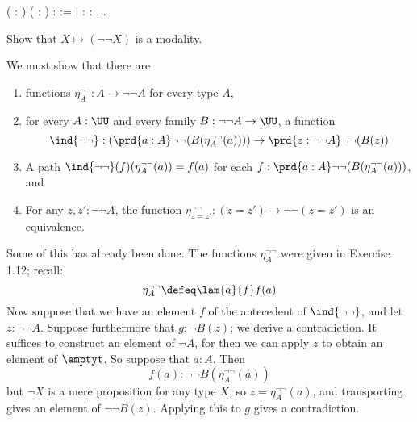   \begin{coqdoccode}
\coqdocemptyline
\coqdocnoindent
{}  ( : ) ( :   ) :  :=\coqdoceol
\coqdocindent{1.00em}
\ensuremath{|}  : \coqdockw{\ensuremath{\forall}}  : ,          .\coqdoceol
\coqdocemptyline
\end{coqdoccode}
               

Show that $X \mapsto (\lnot \lnot X)$ is a modality.


 \soln
We must show that there are
\begin{enumerate}
  \item functions $\eta^{\lnot \lnot}_{A} : A \to \lnot\lnot A$ for every type
  $A$,
  \item for every $A : \UU$ and every family $B : \lnot\lnot A \to \UU$, a
  function
  \[
    \ind{\lnot\lnot} : 
    \left(\prd{a : A}\lnot\lnot(B(\eta^{\lnot\lnot}_{A}(a)))\right)
    \to
    \prd{z : \lnot\lnot A}\lnot\lnot(B(z))
  \]
  \item A path $\ind{\lnot\lnot}(f)(\eta^{\lnot\lnot}_{A}(a)) = f(a)$ for each
  $f : \prd{a : A}\lnot\lnot(B(\eta^{\lnot\lnot}_{A}(a)))$, and
  \item For any $z, z' : \lnot \lnot A$, the function $\eta^{\lnot\lnot}_{z =
  z'} : (z = z') \to \lnot\lnot(z = z')$ is an equivalence.
\end{enumerate}
Some of this has already been done.  The functions $\eta^{\lnot\lnot}_{A}$ were
given in Exercise 1.12; recall:
\[
  \eta^{\lnot\lnot}_{A} \defeq \lam{a}{f}f(a)
\]
Now suppose that we have an element $f$ of the antecedent of
$\ind{\lnot\lnot}$, and let $z : \lnot\lnot A$.  Suppose furthermore
that $g : \lnot B(z)$; we derive a contradiction.  It suffices to
construct an element of $\lnot A$, for then we can apply $z$ to obtain
an element of $\emptyt$.  So suppose that $a : A$.  Then 
\[
  f(a) : \lnot \lnot B(\eta^{\lnot\lnot}_{A}(a))
\]
but $\lnot X$ is a mere proposition for any type $X$, so $z =
\eta^{\lnot\lnot}_{A}(a)$, and transporting gives an element of $\lnot \lnot
B(z)$.  Applying this to $g$ gives a contradiction.


